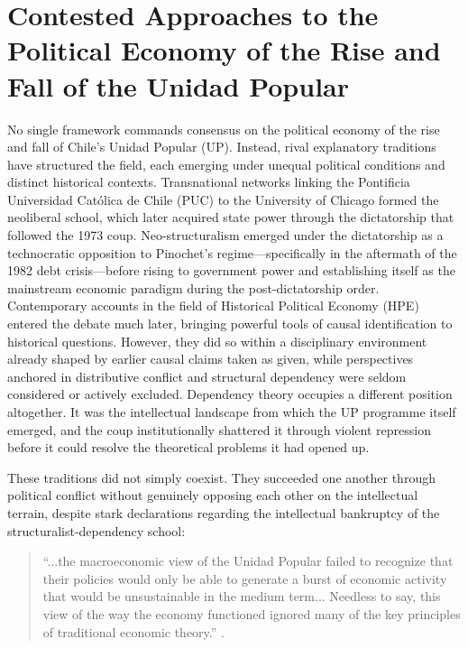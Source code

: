 \section{Contested Approaches to the Political Economy of the Rise and Fall of the Unidad Popular}
\label{sec:literature_review}

No single framework commands consensus on the political economy of the rise and fall of Chile's Unidad Popular (UP). Instead, rival explanatory traditions have structured the field, each emerging under unequal political conditions and distinct historical contexts. Transnational networks linking the Pontificia Universidad Católica de Chile (PUC) to the University of Chicago formed the neoliberal school, which later acquired state power through the dictatorship that followed the 1973 coup. Neo-structuralism emerged under the dictatorship as a technocratic opposition to Pinochet's regime—specifically in the aftermath of the 1982 debt crisis—before rising to government power and establishing itself as the mainstream economic paradigm during the post-dictatorship order. Contemporary accounts in the field of Historical Political Economy (HPE) entered the debate much later, bringing powerful tools of causal identification to historical questions. However, they did so within a disciplinary environment already shaped by earlier causal claims taken as given, while perspectives anchored in distributive conflict and structural dependency were seldom considered or actively excluded. Dependency theory occupies a different position altogether. It was the intellectual landscape from which the UP programme itself emerged, and the coup institutionally shattered it through violent repression before it could resolve the theoretical problems it had opened up.

These traditions did not simply coexist. They succeeded one another through political conflict without genuinely opposing each other on the intellectual terrain, despite stark declarations regarding the intellectual bankruptcy of the structuralist-dependency school: 

\begin{quote}
	``...the macroeconomic view of the Unidad Popular failed to recognize that their policies would only be able to generate a burst of economic activity that would be unsustainable in the medium term... Needless to say, this view of the way the economy functioned ignored many of the key principles of traditional economic theory.'' \citep[p.~16--17]{DornbuschEdwards1989}.
\end{quote}

